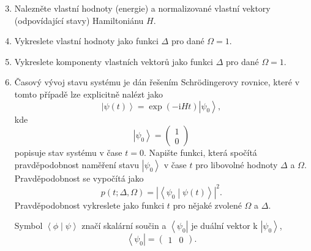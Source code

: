 \documentclass[a4paper,11pt,twoside]{article}
\newcommand{\im}{\mathrm{i}}
\def\abs#1{\left|#1\right|}
\def\ket#1{\left|{#1}\right\rangle}
\def\bra#1{\left\langle{#1}\right|}
\def\braket#1#2{\left\langle{#1}\middle|{#2}\right\rangle}
\begin{document}
\begin{enumerate}
    \setcounter{enumi}{2}
    \item 
    Nalezněte vlastní hodnoty (energie) a normalizované vlastní vektory (odpovídající stavy) Hamiltoniánu $H$.
    
    \item 
    Vykreslete vlastní hodnoty jako funkci $\Delta$ pro dané $\Omega=1$.

    \item
    Vykreslete komponenty vlastních vektorů jako funkci $\Delta$ pro dané $\Omega=1$.

    \item
    Časový vývoj stavu systému je dán řešením Schrödingerovy rovnice, které v tomto případě lze explicitně nalézt jako
    \begin{equation*}
        \ket{\psi(t)}=\exp\left(-\im H t\right)\ket{\psi_{0}},
    \end{equation*}    
    kde
    \begin{equation*}
        \ket{\psi_{0}}=\begin{pmatrix}1 \\ 0\end{pmatrix}
    \end{equation*}
    popisuje stav systému v čase $t=0$.
    Napište funkci, která spočítá pravděpodobnost naměření stavu $\ket{\psi_{0}}$ v čase $t$ pro libovolné hodnoty $\Delta$ a $\Omega$.
    Pravděpodobnost se vypočítá jako
    \begin{equation*}
        p(t;\Delta,\Omega)=\abs{\braket{\psi_{0}}{\psi(t)}}^2.
    \end{equation*}
    Pravděpodobnost vykreslete jako funkci $t$ pro nějaké zvolené $\Omega$ a $\Delta$.

    Symbol $\braket{\phi}{\psi}$ značí skalární součin a $\bra{\psi_{0}}$ je duální vektor k $\ket{\psi_{0}}$,
    \begin{equation*}
        \bra{\psi_{0}}=\begin{pmatrix}1 & 0\end{pmatrix}.
    \end{equation*}

\end{enumerate}
\end{document}
